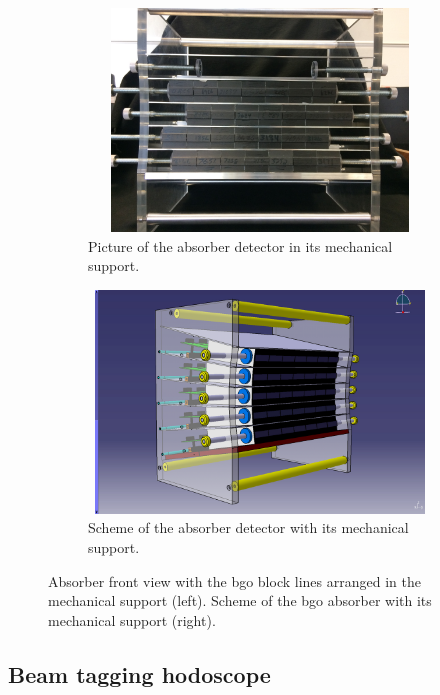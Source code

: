 \begin{figure}
\begin{subfigure}[b]{.5\textwidth}
\centering
\includegraphics[width=1\textwidth, height=16em]{03_GraphicFiles/chapter3_CLaRySproto/Absorber/images/absorber_picture.JPG}
\caption{Picture of the absorber detector in its mechanical support.}
\label{chap3::fig::absorberPicture}
\end{subfigure}
\begin{subfigure}[b]{.5\textwidth}
\centering
\includegraphics[width=1\textwidth, height=16em]{03_GraphicFiles/chapter3_CLaRySproto/Absorber/images/Absorbeur.jpg}
\caption{Scheme of the absorber detector with its mechanical support.}
\label{chap3::fig::absorber30Scheme}
\end{subfigure}
\caption{Absorber front view with the \gls{bgo} block lines arranged in the mechanical support (left). Scheme of the \gls{bgo} absorber with its mechanical support (right).}
\label{chap3::fig::absorber_scheme}
\end{figure}


\subsection{Beam tagging hodoscope}\label{chap3::subsec::hodoscope}

